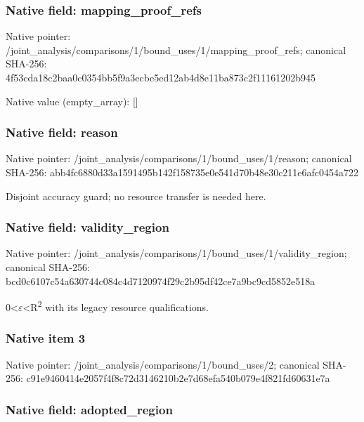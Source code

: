 \documentclass[10pt,a4paper]{article}
\begin{document}
\subsubsection{Native field: mapping\_proof\_refs}


Native pointer: /joint\_analysis/comparis\allowbreak{}ons/1/bound\_uses/1/mappi\allowbreak{}ng\_proof\_refs; canonical SHA-256: 4f53cda18c2baa0c0354bb5f\allowbreak{}9a3ecbe5ed12ab4d8e11ba87\allowbreak{}3c2f11161202b945



Native value (empty\_array): []



\subsubsection{Native field: reason}


Native pointer: /joint\_analysis/comparis\allowbreak{}ons/1/bound\_uses/1/reaso\allowbreak{}n; canonical SHA-256: abb4fc6880d33a1591495b14\allowbreak{}2f158735e0e541d70b48e30c\allowbreak{}211e6afc0454a722


Disjoint accuracy guard; no resource transfer is needed here.


\subsubsection{Native field: validity\_region}


Native pointer: /joint\_analysis/comparis\allowbreak{}ons/1/bound\_uses/1/valid\allowbreak{}ity\_region; canonical SHA-256: bcd0c6107c54a630744c084c\allowbreak{}4d7120974f29c2b95df42ce7\allowbreak{}a9bc9cd5852e518a


0<\ensuremath{\varepsilon}<R\textsuperscript{2} with its legacy resource qualifications.


\subsubsection{Native item 3}


Native pointer: /joint\_analysis/comparis\allowbreak{}ons/1/bound\_uses/2; canonical SHA-256: c91e9460414e2057f4f8c72d\allowbreak{}3146210b2e7d68efa540b079\allowbreak{}e4f821fd60631e7a



\subsubsection{Native field: adopted\_region}
\end{document}
